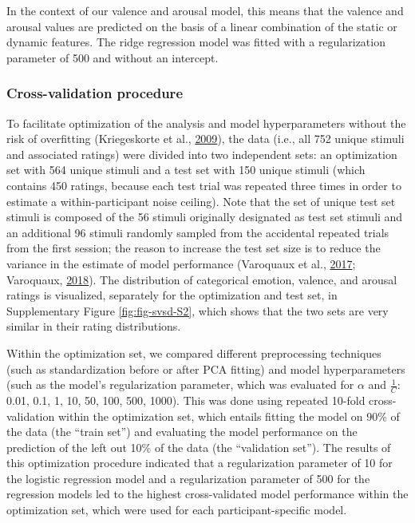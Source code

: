 \documentclass[12pt,american,a4paper,oneside,]{memoir} %
\begin{document}
In the context of our valence and arousal model, this means that the valence and arousal values are predicted on the basis of a linear combination of the static or dynamic features. The ridge regression model was fitted with a regularization parameter of 500 and without an intercept.

\hypertarget{svsd-cv}{%
\subsubsection{Cross-validation procedure}\label{svsd-cv}}

To facilitate optimization of the analysis and model hyperparameters without the risk of overfitting (Kriegeskorte et al., \protect\hyperlink{ref-kriegeskorte2009circular}{2009}), the data (i.e., all 752 unique stimuli and associated ratings) were divided into two independent sets: an optimization set with 564 unique stimuli and a test set with 150 unique stimuli (which contains 450 ratings, because each test trial was repeated three times in order to estimate a within-participant noise ceiling). Note that the set of unique test set stimuli is composed of the 56 stimuli originally designated as test set stimuli and an additional 96 stimuli randomly sampled from the accidental repeated trials from the first session; the reason to increase the test set size is to reduce the variance in the estimate of model performance (Varoquaux et al., \protect\hyperlink{ref-Varoquaux2017-fj}{2017}; Varoquaux, \protect\hyperlink{ref-Varoquaux2018-uo}{2018}). The distribution of categorical emotion, valence, and arousal ratings is visualized, separately for the optimization and test set, in Supplementary Figure \ref{fig:fig-svsd-S2}, which shows that the two sets are very similar in their rating distributions.

Within the optimization set, we compared different preprocessing techniques (such as standardization before or after PCA fitting) and model hyperparameters (such as the model's regularization parameter, which was evaluated for \(\alpha\) and \(\frac{1}{C}\): 0.01, 0.1, 1, 10, 50, 100, 500, 1000). This was done using repeated 10-fold cross-validation within the optimization set, which entails fitting the model on 90\% of the data (the ``train set'') and evaluating the model performance on the prediction of the left out 10\% of the data (the ``validation set''). The results of this optimization procedure indicated that a regularization parameter of 10 for the logistic regression model and a regularization parameter of 500 for the regression models led to the highest cross-validated model performance within the optimization set, which were used for each participant-specific model.
\end{document}
